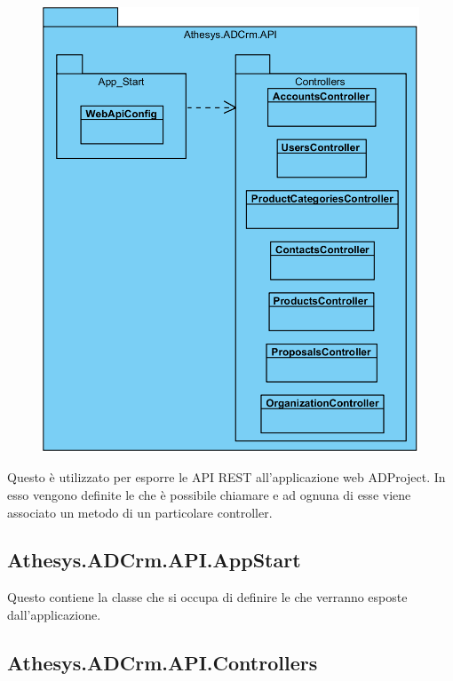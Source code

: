 \begin{figure}[H]
	\centering
	\includegraphics[width=\linewidth]{images/modules/API}
	\caption{}
	\label{fig:api}
\end{figure}

Questo  è utilizzato per esporre le API REST all'applicazione web ADProject. In esso vengono definite le  che è possibile chiamare e ad ognuna di esse viene associato un metodo di un particolare controller. 

\subsection{Athesys.ADCrm.API.AppStart}
Questo  contiene la classe che si occupa di definire le  che verranno esposte dall'applicazione.

\subsection{Athesys.ADCrm.API.Controllers}

